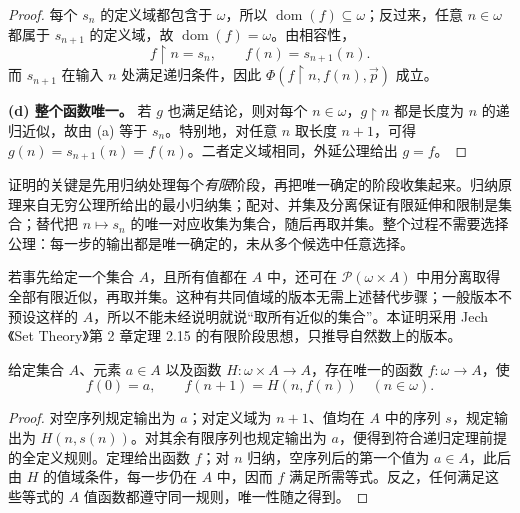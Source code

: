 \documentclass[lang=cn,a4paper,fontset=none,zihao=false,10pt,openany,twoside]{beautybook}
\numberwithin{algorithm}{chapter}
\newcommand{\Pow}{\mathcal P}
\begin{document}
\begin{proof}
每个 $s_n$ 的定义域都包含于 $\omega$，所以 $\operatorname{dom}(f)\subseteq\omega$；反过来，任意 $n\in\omega$ 都属于 $s_{n+1}$ 的定义域，故 $\operatorname{dom}(f)=\omega$。由相容性，
\[
 f\mathbin{\upharpoonright}n=s_n,\qquad
 f(n)=s_{n+1}(n).
\]
而 $s_{n+1}$ 在输入 $n$ 处满足递归条件，因此 $\Phi(f\mathbin{\upharpoonright}n,f(n),\vec p)$ 成立。

\par\smallskip\noindent\textbf{(d) 整个函数唯一。}\quad
若 $g$ 也满足结论，则对每个 $n\in\omega$，$g\mathbin{\upharpoonright}n$ 都是长度为 $n$ 的递归近似，故由 (a) 等于 $s_n$。特别地，对任意 $n$ 取长度 $n+1$，可得 $g(n)=s_{n+1}(n)=f(n)$。二者定义域相同，外延公理给出 $g=f$。
\end{proof}

\begin{remark}[递归为什么不必另列为公理]
证明的关键是先用归纳处理每个\emph{有限}阶段，再把唯一确定的阶段收集起来。归纳原理来自无穷公理所给出的最小归纳集；配对、并集及分离保证有限延伸和限制是集合；替代把 $n\mapsto s_n$ 的唯一对应收集为集合，随后再取并集。整个过程不需要选择公理：每一步的输出都是唯一确定的，未从多个候选中任意选择。

若事先给定一个集合 $A$，且所有值都在 $A$ 中，还可在 $\Pow(\omega\times A)$ 中用分离取得全部有限近似，再取并集。这种有共同值域的版本无需上述替代步骤；一般版本不预设这样的 $A$，所以不能未经说明就说“取所有近似的集合”。本证明采用 Jech《Set Theory》第 2 章定理 2.15 的有限阶段思想，只推导自然数上的版本。
\end{remark}

\begin{corollary}[给定初值和递推步骤]\label{cor:zfc-step-recursion}
给定集合 $A$、元素 $a\in A$ 以及函数 $H:\omega\times A\to A$，存在唯一的函数 $f:\omega\to A$，使
\[
 f(0)=a,\qquad f(n+1)=H(n,f(n))\quad(n\in\omega).
\]
\end{corollary}
\begin{proof}
对空序列规定输出为 $a$；对定义域为 $n+1$、值均在 $A$ 中的序列 $s$，规定输出为 $H(n,s(n))$。对其余有限序列也规定输出为 $a$，便得到符合递归定理前提的全定义规则。定理给出函数 $f$；对 $n$ 归纳，空序列后的第一个值为 $a\in A$，此后由 $H$ 的值域条件，每一步仍在 $A$ 中，因而 $f$ 满足所需等式。反之，任何满足这些等式的 $A$ 值函数都遵守同一规则，唯一性随之得到。
\end{proof}
\end{document}
